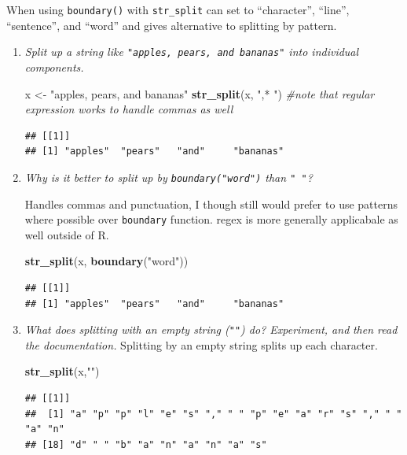\documentclass[]{book}
\newenvironment{Shaded}{\begin{snugshade}}{\end{snugshade}}
\newcommand{\CommentTok}[1]{\textcolor[rgb]{0.56,0.35,0.01}{\textit{#1}}}
\newcommand{\KeywordTok}[1]{\textcolor[rgb]{0.13,0.29,0.53}{\textbf{#1}}}
\newcommand{\NormalTok}[1]{#1}
\newcommand{\StringTok}[1]{\textcolor[rgb]{0.31,0.60,0.02}{#1}}
\theoremstyle{definition}
\theoremstyle{definition}
\theoremstyle{definition}
\theoremstyle{remark}
\begin{document}
When using \texttt{boundary()} with \texttt{str\_split} can set to
``character'', ``line'', ``sentence'', and ``word'' and gives
alternative to splitting by pattern.

\begin{enumerate}
\def\labelenumi{\arabic{enumi}.}
\item
  \emph{Split up a string like \texttt{"apples,\ pears,\ and\ bananas"}
  into individual} \emph{components.}

\begin{Shaded}
\begin{Highlighting}[]
\NormalTok{x <-}\StringTok{ "apples, pears, and bananas"}
\KeywordTok{str_split}\NormalTok{(x, }\StringTok{",* "}\NormalTok{)  }\CommentTok{#note that regular expression works to handle commas as well}
\end{Highlighting}
\end{Shaded}

\begin{verbatim}
## [[1]]
## [1] "apples"  "pears"   "and"     "bananas"
\end{verbatim}
\item
  \emph{Why is it better to split up by \texttt{boundary("word")} than
  \texttt{"\ "}?}

  Handles commas and punctuation, I though still would prefer to use
  patterns where possible over \texttt{boundary} function. regex is more
  generally applicabale as well outside of R.

\begin{Shaded}
\begin{Highlighting}[]
\KeywordTok{str_split}\NormalTok{(x, }\KeywordTok{boundary}\NormalTok{(}\StringTok{"word"}\NormalTok{))}
\end{Highlighting}
\end{Shaded}

\begin{verbatim}
## [[1]]
## [1] "apples"  "pears"   "and"     "bananas"
\end{verbatim}
\item
  \emph{What does splitting with an empty string (\texttt{""}) do?
  Experiment, and} \emph{then read the documentation.} Splitting by an
  empty string splits up each character.

\begin{Shaded}
\begin{Highlighting}[]
\KeywordTok{str_split}\NormalTok{(x,}\StringTok{""}\NormalTok{)}
\end{Highlighting}
\end{Shaded}

\begin{verbatim}
## [[1]]
##  [1] "a" "p" "p" "l" "e" "s" "," " " "p" "e" "a" "r" "s" "," " " "a" "n"
## [18] "d" " " "b" "a" "n" "a" "n" "a" "s"
\end{verbatim}
\end{enumerate}
\end{document}
